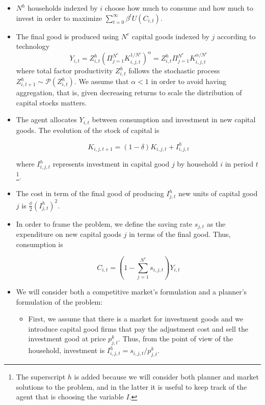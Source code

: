 \documentclass[11pt,english]{article}
\begin{document}
\begin{itemize}
	\item $N^h$ households indexed by $i$ choose how much to consume and how much to invest in order to maximize $\sum_{t=0}^{\infty} \beta^t U(C_{i,t})$.\medskip
	
	\item The final good is produced using $N^c$ capital goods indexed by $j$ according to technology $$Y_{i,t}=Z^h_{i,t} \left(\Pi_{j=1}^{N^c} K_{i,j,t}^{1/N^c} \right)^{\alpha} = Z^h_{i,t} \Pi_{j=1}^{N^c} K_{i,j,t}^{\alpha/N^c}$$  where total factor productivity $Z^h_{i,t}$ follows the stochastic process $Z^h_{i,t+1} \sim \mathcal P(Z^h_{i,t})$. We assume that $\alpha<1$ in order to avoid having aggregation, that is, given decreasing returns to scale the distribution of capital stocks matters.  \medskip
	
	\item The agent allocates $Y_{i,t}$ between consumption and investment in new capital goods. The evolution of the stock of capital is 
	
	$$K_{i,j,t+1} = (1-\delta) K_{i,j,t} + I^h_{i,j,t}$$ 
	
	where $I^h_{i,j,t}$ represents investment in capital good $j$ by household $i$ in period $t$\footnote{The superscript $h$ is added because we will consider both planner and market solutions to the problem, and in the latter it is useful to keep track of the agent that is choosing the variable $I$.}. 
	
	\item The cost in term of the final good of  producing $I^h_{j,t}$ new units of capital good $j$  is $\frac{\phi}{2} \left(I^h_{j,t}\right)^2$.  \medskip
	
	\item In order to frame the problem, we define the saving rate $s_{j,t}$ as the expenditure on new capital goods $j$ in terms of the final good. Thus, consumption is 
	
	$$C_{i,t}=(1-\sum_{j=1}^{N^c} s_{i,j,t})Y_{i,t}$$ 
	
	\item We will consider both a competitive market's formulation and a planner's formulation of the problem: 
	
	\begin{itemize}
		\item First, we assume that there is a market for investment goods and we introduce capital good firms that pay the adjustment cost and sell the investment good at price $p^k_{j,t}$. Thus, from the point of view of the household, investment is $I^h_{i,j,t} = s_{i,j,t}/p^k_{j,t}$.   \medskip
		

\end{itemize}
\end{itemize}
\end{document}

